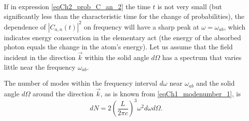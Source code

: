 If in expression \eqref{eqCh2_prob_C_an_2} the time $t$ is not very small (but
significantly less than the characteristic time for the change of probabilities),
the dependence of $\left|C_{a,n}\left(t\right)\right|^2$ on frequency will
have a sharp peak at $\omega = \omega_{ab}$, which indicates
energy conservation in the elementary act (the energy of the absorbed photon
equals the change in the atom's energy). Let us assume that the field incident in the direction
$\vec{k}$ within the solid angle $d \Omega$ has a spectrum that varies little near the frequency $\omega_{ab}$. 
 
The number of modes within the frequency interval $d \omega$ near
$\omega_{ab}$ and the solid angle $d \Omega$ around the direction
$\vec{k}$, as is known from \eqref{eqCh1_modenumber_1}, is
\begin{equation}
d N = 2 \left(\frac{L}{2 \pi c} \right)^3 \omega^2 d \omega d \Omega.
\end{equation}

